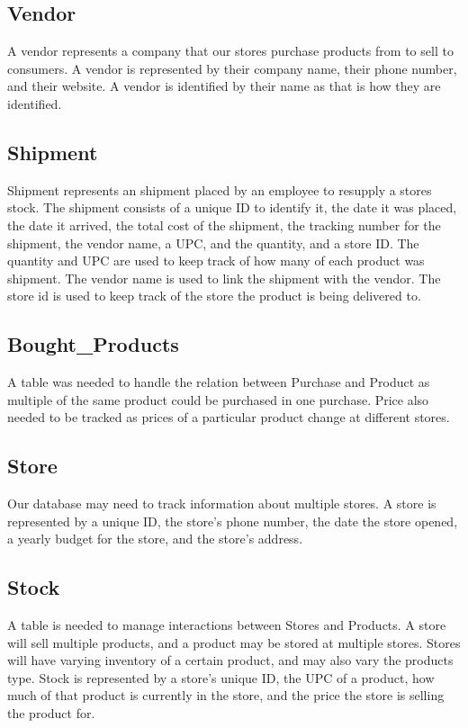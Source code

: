 \documentclass{article}
\begin{document}
		\subsection{Vendor}
			A vendor represents a company that our stores purchase products from to
			sell to consumers. A vendor is represented by their company name, their
			phone number, and their website. A vendor is identified by their name as
			that is how they are identified.

		\subsection{Shipment}
			Shipment represents an shipment placed by an employee to resupply a stores
			stock. The shipment consists of a unique ID to identify it, the date it was placed, 
			the date it arrived, the total cost of the shipment, the tracking number for the
			shipment, the vendor name, a UPC, and the quantity, and a store ID. The quantity 
			and UPC are used to keep track of how many of each product was shipment. 
			The vendor name is used to link the shipment with the vendor. The store id is 
			used to keep track of the store the product is being delivered to.

		\subsection{Bought\_Products}
			A table was needed to handle the relation between Purchase and Product
			as multiple of the same product could be purchased in one purchase.
			Price also needed to be tracked as prices of a particular product change
			at different stores.

		\subsection{Store}
			Our database may need to track information about multiple stores. A store
			is represented by a unique ID, the store's phone number, the date the
			store opened, a yearly budget for the store, and the store's address.

		\subsection{Stock}
			A table is needed to manage interactions between Stores and Products.
			A store will sell multiple products, and a product may be stored at
			multiple stores. Stores will have varying inventory of a certain product,
			and may also vary the products type. Stock is represented by a store's
			unique ID, the UPC of a product, how much of that product is currently in
			the store, and the price the store is selling the product for.
\end{document}
